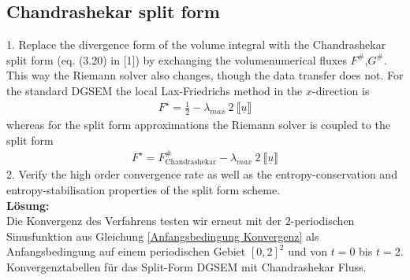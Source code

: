 \documentclass[11pt]{scrartcl}
\begin{document}
\subsection{Chandrashekar split form}
1. Replace the divergence form of the volume integral with the Chandrashekar split form (eq.  (3.20) in [1]) by exchanging the volumenumerical fluxes $F^\#$,$G^\#$. This way the Riemann solver also changes, though the data transfer does not. For the standard DGSEM the local Lax-Friedrichs method in the $x$-direction is 
\begin{align}
F^{\star} =\frac{1}{2}- \lambda_{max} \ 2 \ \llbracket \underline{u} \rrbracket
\end{align}
whereas for the split form approximations the Riemann solver is coupled to the split form
\begin{align}
 F^{\star} = F^\#_{\text{Chandrashekar}} - \lambda_{max} \ 2 \ \llbracket \underline{u} \rrbracket
\end{align}
2. Verify the high order convergence rate as well as the entropy-conservation and entropy-stabilisation properties of the split form scheme. \\
\newline
\textbf{Lösung:} \\
Die Konvergenz des Verfahrens testen wir erneut mit der $2$-periodischen Sinusfunktion aus Gleichung \ref{Anfangsbedingung Konvergenz} als Anfangsbedingung auf einem periodischen Gebiet $[0, 2]^2$ und von $t=0$ bis $t=2$.\\

Konvergenztabellen für das Split-Form DGSEM mit Chandrashekar Fluss.
\end{document}
